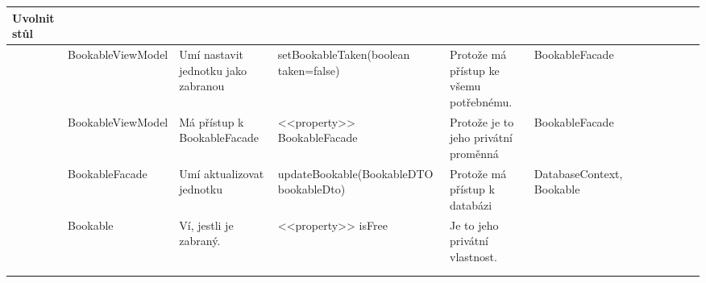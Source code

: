 \begin{landscape}
\begin{longtable}{ Lp{2cm} | Lp{3.5cm} | Lp{3cm} | Lp{4cm} | Lp{4cm} | Lp{4cm} }
    Uvolnit stůl & & & & & \\
    \hline
    & BookableViewModel & Umí nastavit jednotku jako zabranou & setBookableTaken(boolean taken=false) & Protože má přístup ke všemu potřebnému. & BookableFacade\\
    & BookableViewModel & Má přístup k BookableFacade & <<property>> BookableFacade & Protože je to jeho privátní proměnná & BookableFacade \\
    & BookableFacade & Umí aktualizovat jednotku & updateBookable(BookableDTO bookableDto) & Protože má přístup k databázi & DatabaseContext, Bookable\\
    & Bookable & Ví, jestli je zabraný. & <<property>> isFree & Je to jeho privátní vlastnost. & \\
    & & & & & \\
    & & & & & \\
    
    
    
    \hline
\end{longtable}
\end{landscape}